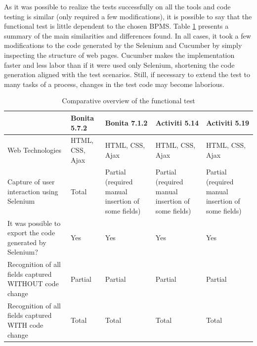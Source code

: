 \documentclass[runningheads,a4paper]{llncs}
\begin{document}
As it was possible to realize the tests successfully on all the tools and code testing is similar (only required a few modifications), it is possible to say that the functional test is little dependent to the chosen BPMS. Table \ref{tab:testeFuncional} presents a summary of the main similarities and differences found. In all cases, it took a few modifications to the code generated by the Selenium and Cucumber by simply inspecting the structure of web pages. Cucumber makes the implementation faster and less labor than if it were used only Selenium, shortening the code generation aligned with the test scenarios. Still, if necessary to extend the test to many tasks of a process, changes in the test code may become laborious.

\begin{table}
\centering
\begin{center}
\begin{tabular}{p{3cm}|p{2cm}|p{2.5cm}|p{2.5cm}|p{2.5cm}}
\hline
 & Bonita 5.7.2 & Bonita 7.1.2 & Activiti 5.14 & Activiti 5.19 \\\hline
Web Technologies & HTML, CSS, Ajax & HTML, CSS, Ajax & HTML, CSS, Ajax & HTML, CSS, Ajax \\\hline
Capture of user interaction using Selenium & Total & Partial (required manual insertion of some fields) & Partial (required manual insertion of some fields) & Partial (required manual insertion of some fields) \\\hline
It was possible to export the code generated by Selenium? & Yes & Yes & Yes & Yes\\\hline
Recognition of all fields captured WITHOUT code change & Partial & Partial & Partial & Partial \\\hline
Recognition of all fields captured WITH code change & Total & Total & Total & Total \\\hline
\end{tabular}
\caption{Comparative overview of the functional test}
\label{tab:testeFuncional}
\end{center}
\end{table}
\end{document}
